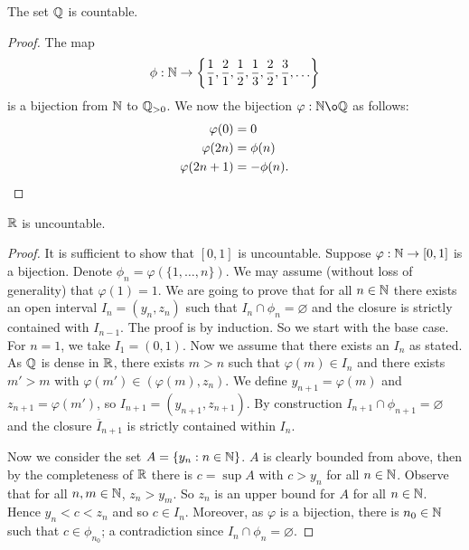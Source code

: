 \begin{proposition}[]
	The set $\mathbb{Q}$ is countable.
\end{proposition}

\begin{proof}
	The map \[
		\phi: \mathbb{N} \to \left\{ 
			\frac11,
			\frac21,
			\frac12,
			\frac13,
			\frac22,
			\frac31,
			\ldots
		\right\}
	\]
	is a bijection from $\mathbb{N}$ to $\mathbb{Q}_{>0}$.
	We now the bijection $\varphi: \N \o \Q$ as follows:
	\begin{align*}
		\varphi(0) &= 0 \\
		\varphi(2n) &= \phi(n) \\
		\varphi(2n + 1) &= -\phi(n). \qedhere
	\end{align*}
\end{proof}

\begin{proposition}[]
	$\mathbb{R}$ is uncountable.
\end{proposition}

\begin{proof}
	It is sufficient to show that $[0,1]$ is uncountable.
	Suppose $\varphi: \mathbb{N} \to [0,1]$ is a bijection.
	Denote $\phi_n = \varphi(\{1, \ldots, n\})$.
	We may assume (without loss of generality)
	that $\varphi(1) = 1$.
	We are going to prove that for all $n \in \mathbb{N}$
	there exists an open interval $I_n = (y_n, z_n)$
	such that $I_n \cap \phi_n = \varnothing$ and the closure is strictly
	contained with $I_{n - 1}$. 
	The proof is by induction. So we start with the base case.
	For $n = 1$, we take $I_1 = (0,1)$.
	Now we assume that there exists an $I_n$ as stated.
	As $\mathbb{Q}$ is dense in $\mathbb{R}$,
	there exists $m > n$ such that $\varphi(m) \in I_n$
	and there exists $m' > m$ with $\varphi(m') \in (\varphi(m), z_n)$.
	We define $y_{n+1} = \varphi(m)$ and $z_{n+1} = \varphi(m')$,
	so $I_{n+1} = (y_{n+1}, z_{n+1})$. 
	By construction $I_{n+1} \cap \phi_{n+1} = \varnothing$
	and the closure $\overline I_{n+1}$ is strictly contained within $I_n$.

	Now we consider the set $A = \{y_n : n \in \mathbb{N}\}$.
	$A$ is clearly bounded from above, then by the completeness of $\mathbb{R}$
	there is $c = \sup A$ with $c > y_n$ for all $n \in \mathbb{N}$.
	Observe that for all $n, m \in \mathbb{N}$, $z_n > y_m$.
	So $z_n$ is an upper bound for $A$ for all $n \in \mathbb{N}$.
	Hence $y_n < c < z_n$ and so $c \in I_n$.
	Moreover, as $\varphi$ is a bijection, there is $n_0 \in \mathbb{N}$ such that
	$c \in \phi_{n_0}$;
	a contradiction since $I_n \cap \phi_n = \varnothing$.
\end{proof}

